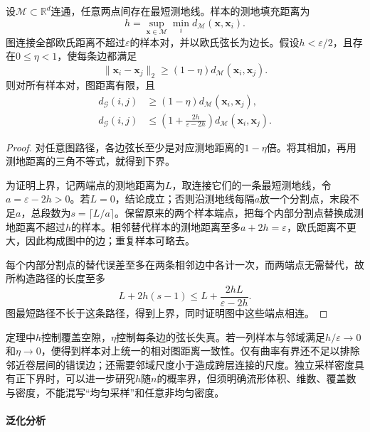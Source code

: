 \begin{theorem}[覆盖条件下的图距离界]
  \label{thm:dim-isomap-bound}
  设$\mathcal{M}\subset\mathbb{R}^d$连通，任意两点间存在最短测地线。样本的测地填充距离为
  \[
    h=\sup_{\bm{x}\in\mathcal{M}}\min_i
      d_{\mathcal{M}}(\bm{x},\bm{x}_i).
  \]
  图连接全部欧氏距离不超过$\varepsilon$的样本对，并以欧氏弦长为边长。假设$h<\varepsilon/2$，且存在$0\leq\eta<1$，使每条边都满足
  \[
    \lVert\bm{x}_i-\bm{x}_j\rVert_2
    \geq(1-\eta)d_{\mathcal{M}}(\bm{x}_i,\bm{x}_j).
  \]
  则对所有样本对，图距离有限，且
  \begin{equation}
    \label{eq:dim-isomap-bound}
    \begin{aligned}
      d_{\mathcal{G}}(i,j)
        &\geq(1-\eta)d_{\mathcal{M}}(\bm{x}_i,\bm{x}_j),\\
      d_{\mathcal{G}}(i,j)
        &\leq\left(1+\frac{2h}{\varepsilon-2h}\right)
          d_{\mathcal{M}}(\bm{x}_i,\bm{x}_j).
    \end{aligned}
  \end{equation}
\end{theorem}
\begin{proof}
  对任意图路径，各边弦长至少是对应测地距离的$1-\eta$倍。将其相加，再用测地距离的三角不等式，就得到下界。

  为证明上界，记两端点的测地距离为$L$，取连接它们的一条最短测地线，令$a=\varepsilon-2h>0$。若$L=0$，结论成立；否则沿测地线每隔$a$放一个分割点，末段不足$a$，总段数为$s=\lceil L/a\rceil$。保留原来的两个样本端点，把每个内部分割点替换成测地距离不超过$h$的样本。相邻替代样本的测地距离至多$a+2h=\varepsilon$，欧氏距离不更大，因此构成图中的边；重复样本可略去。

  每个内部分割点的替代误差至多在两条相邻边中各计一次，而两端点无需替代，故所构造路径的长度至多
  \[
    L+2h(s-1)
    \leq L+\frac{2hL}{\varepsilon-2h}.
  \]
  图最短路径不长于这条路径，得到上界，同时证明图中这些端点相连。
\end{proof}

定理中$h$控制覆盖空隙，$\eta$控制每条边的弦长失真。若一列样本与邻域满足$h/\varepsilon\to0$和$\eta\to0$，便得到样本对上统一的相对图距离一致性。仅有曲率有界还不足以排除邻近卷层间的错误边；还需要邻域尺度小于造成跨层连接的尺度。独立采样密度具有正下界时，可以进一步研究$h$随$n$的概率界，但须明确流形体积、维数、覆盖数与密度，不能混写“均匀采样”和任意非均匀密度。

\paragraph{泛化分析}

